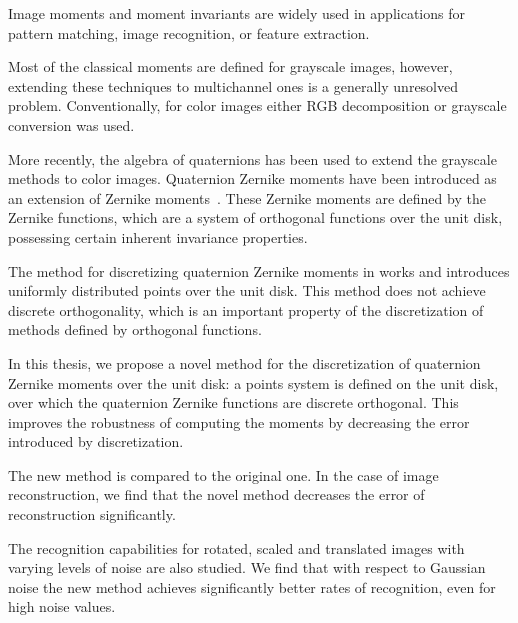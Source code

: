 Image moments and moment invariants are widely used in applications for pattern matching, image recognition, or feature extraction.

Most of the classical moments are defined for grayscale images, however, extending these techniques to multichannel ones is a generally unresolved problem. Conventionally, for color images either RGB decomposition or grayscale conversion was used.

More recently, the algebra of quaternions has been used to extend the grayscale methods to color images. Quaternion Zernike moments have been introduced as an extension of Zernike moments~\cite{qzm}. These Zernike moments are defined by the Zernike functions, which are a system of orthogonal functions over the unit disk, possessing certain inherent invariance properties.

The method for discretizing quaternion Zernike moments in works \cite{qzm} and \cite{qzmi} introduces uniformly distributed points over the unit disk. This method does not achieve discrete orthogonality, which is an important property of the discretization of methods defined by orthogonal functions.

In this thesis, we propose a novel method for the discretization of quaternion Zernike moments over the unit disk: a points system is defined on the unit disk, over which the quaternion Zernike functions are discrete orthogonal. This improves the robustness of computing the moments by decreasing the error introduced by discretization.

The new method is compared to the original one. In the case of image reconstruction, we find that the novel method decreases the error of reconstruction significantly.

The recognition capabilities for rotated, scaled and translated images with varying levels of noise are also studied. We find that with respect to Gaussian noise the new method achieves significantly better rates of recognition, even for high noise values.